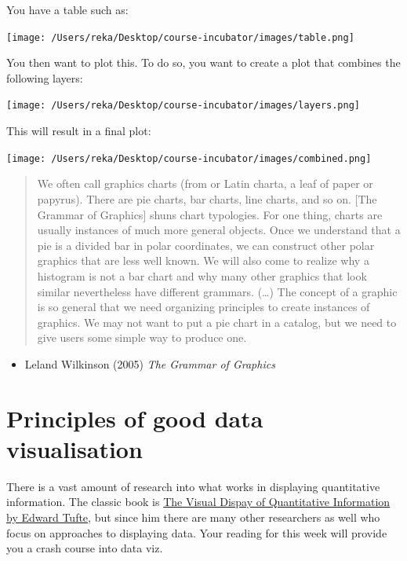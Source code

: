 \documentclass[]{book}
\providecommand{\tightlist}{%
  \setlength{\itemsep}{0pt}\setlength{\parskip}{0pt}}
\theoremstyle{definition}
\theoremstyle{definition}
\theoremstyle{definition}
\theoremstyle{remark}
\begin{document}
You have a table such as:

\texttt{[image: /Users/reka/Desktop/course-incubator/images/table.png]}

You then want to plot this. To do so, you want to create a plot that
combines the following layers:

\texttt{[image: /Users/reka/Desktop/course-incubator/images/layers.png]}

This will result in a final plot:

\texttt{[image: /Users/reka/Desktop/course-incubator/images/combined.png]}

\begin{quote}
We often call graphics charts (from or Latin charta, a leaf of paper or
papyrus). There are pie charts, bar charts, line charts, and so on.
{[}The Grammar of Graphics{]} shuns chart typologies. For one thing,
charts are usually instances of much more general objects. Once we
understand that a pie is a divided bar in polar coordinates, we can
construct other polar graphics that are less well known. We will also
come to realize why a histogram is not a bar chart and why many other
graphics that look similar nevertheless have different grammars.
(\ldots{}) The concept of a graphic is so general that we need
organizing principles to create instances of graphics. We may not want
to put a pie chart in a catalog, but we need to give users some simple
way to produce one.
\end{quote}

\begin{itemize}
\tightlist
\item
  Leland Wilkinson (2005) \emph{The Grammar of Graphics}
\end{itemize}

\hypertarget{principles-of-good-data-visualisation}{%
\section{Principles of good data
visualisation}\label{principles-of-good-data-visualisation}}

There is a vast amount of research into what works in displaying
quantitative information. The classic book is
\href{https://www.edwardtufte.com/tufte/books_vdqi}{The Visual Dispay of
Quantitative Information by Edward Tufte}, but since him there are many
other researchers as well who focus on approaches to displaying data.
Your reading for this week will provide you a crash course into data
viz.
\end{document}
